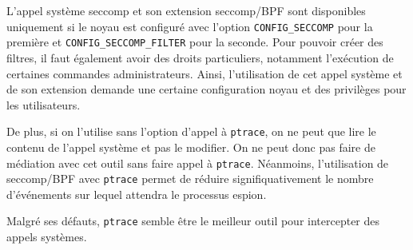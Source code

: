 L'appel système seccomp et son extension seccomp/BPF sont disponibles uniquement si
le noyau est configuré avec l'option \texttt{CONFIG\_SECCOMP} pour la première
et \texttt{CONFIG\_SECCOMP\_FILTER} pour la seconde. Pour pouvoir créer des
filtres, il faut également avoir des droits particuliers, notamment l'exécution
de certaines commandes administrateurs. Ainsi, l'utilisation de cet appel
système et de son extension demande une certaine configuration noyau et des
privilèges pour les utilisateurs.

De plus, si on l'utilise sans l'option d'appel à \texttt{ptrace}, on ne peut que
lire le contenu de l'appel système et pas le modifier. On ne peut donc pas faire
de médiation avec cet outil sans faire appel à \texttt{ptrace}. Néanmoins,
l'utilisation de seccomp/BPF avec \texttt{ptrace} permet de réduire
signifiquativement le nombre d'événements sur lequel attendra le processus
espion.
\vspace{0.5cm}

Malgré ses défauts, \texttt{ptrace} semble être le meilleur outil pour intercepter des appels systèmes.

